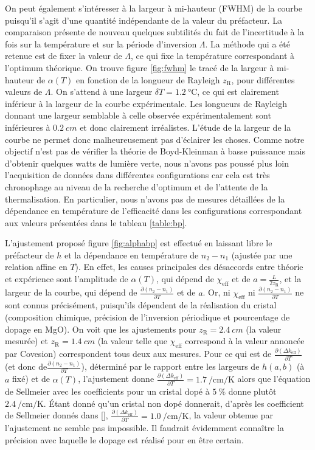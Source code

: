 \documentclass[11pt,a4paper]{article}
\newcommand{\ncite}[1]{[\citenum{#1}]}
\newcommand{\pdv}[2]{\frac{\partial #1}{\partial #2}}
\newcommand{\zr}{z_\mathsc{R}}
\newcommand{\chie}{\chi_\mathsc{eff}}
\newcommand{\dke}{\Delta k_\mathsc{eff}}
\newcommand{\mathsc}[1]{\mathrm{\scriptscriptstyle {#1}}}
\begin{document}
On peut également s'intéresser à la largeur à mi-hauteur (FWHM) de la courbe puisqu'il s'agit d'une quantité indépendante de la valeur du préfacteur.
La comparaison présente de nouveau quelques subtilités du fait de l'incertitude à la fois sur la température et sur la période d'inversion $\Lambda$. La méthode qui a été retenue est de fixer la valeur de $\Lambda$, ce qui fixe la température correspondant à l'optimum théorique.
On trouve figure \ref{fig:fwhm} le tracé de la largeur à mi-hauteur de $\alpha(T)$ en fonction de la longueur de Rayleigh $\zr$, pour différentes valeurs de $\Lambda$. On s'attend à une largeur $\delta T = \SI{1.2}{\celsius}$, ce qui est clairement inférieur à la largeur de la courbe expérimentale. Les longueurs de Rayleigh donnant une largeur semblable à celle observée expérimentalement sont inférieures à $\SI{0.2}{cm}$ et donc clairement irréalistes. L'étude de la largeur de la courbe ne permet donc malheureusement pas d'éclairer les choses. Comme notre objectif n'est pas de vérifier la théorie de Boyd-Kleinman à basse puissance mais d'obtenir quelques watts de lumière verte, nous n'avons pas poussé plus loin l'acquisition de données dans différentes configurations car cela est très chronophage au niveau de la recherche d'optimum et de l'attente de la thermalisation. En particulier, nous n'avons pas de mesures détaillées de la dépendance en température de l'efficacité dans les configurations correspondant aux valeurs présentées dans le tableau \ref{table:bp}.


L'ajustement proposé figure \ref{fig:alphabp} est effectué en laissant libre le préfacteur de $h$ et la dépendance en température de $n_2 - n_1$ (ajustée par une relation affine en $T$). En effet, les causes principales des désaccords entre théorie et expérience sont l'amplitude de $\alpha(T)$, qui dépend de $\chie$ et de $a=\frac{L}{2\zr}$, et la largeur de la courbe, qui dépend de $\pdv{\left(n_2-n_1\right)}{T}$ et de $a$. Or, ni $\chie$ ni $\pdv{\left(n_2-n_1\right)}{T}$ ne sont connus précisément, puisqu'ils dépendent de la réalisation du cristal (composition chimique, précision de l'inversion périodique et pourcentage de dopage en MgO). 
On voit que les ajustements pour $\zr=\SI{2.4}{cm}$ (la valeur mesurée) et $\zr=\SI{1.4}{cm}$ (la valeur telle que $\chie$ correspond à la valeur annoncée par Covesion) correspondent tous deux aux mesures. 
Pour ce qui est de $\pdv{\left(\dke\right)}{T}$ (et donc de$\pdv{\left(n_2-n_1\right)}{T}$), déterminé par le rapport entre les largeurs de $h(a,b)$ (à $a$ fixé) et de $\alpha(T)$, l'ajustement donne $\pdv{\left(\dke\right)}{T}=\SI{1.7}{\per\centi\meter\per\kelvin}$ %
alors que l'équation de Sellmeier avec les coefficients pour un cristal dopé à $\SI{5}{\percent}$ donne plutôt $\SI{2.4}{\per\centi\meter\per\kelvin}$. Étant donné qu'un cristal non dopé donnerait, d'après les coefficient de Sellmeier donnés dans \ncite{covesion}, $\pdv{\left(\dke\right)}{T}=\SI{1.0}{\per\centi\meter\per\kelvin}$, la valeur obtenue par l'ajustement ne semble pas impossible. Il faudrait évidemment connaître la précision avec laquelle le dopage est réalisé pour en être certain. 
\end{document}
